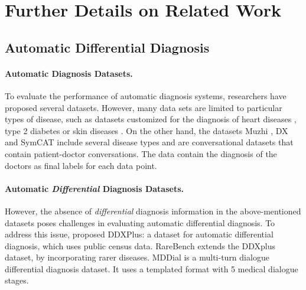 \clearpage
\section{Further Details on Related Work}
\label{app:rel_work}

\subsection{Automatic Differential Diagnosis}

\paragraph{Automatic Diagnosis Datasets.} To evaluate the performance of automatic diagnosis systems, researchers have proposed several datasets. However, many data sets are limited to particular types of disease, such as datasets customized for the diagnosis of heart diseases \cite{ahsan2022machine}, type 2 diabetes \cite{zheng2017machine} or skin diseases \cite{hwang2022differential}. 
 On the other hand, the datasets Muzhi \cite{wei2018task}, DX \cite{xu2019end} and SymCAT \cite{zhong2022hierarchical} include several disease types and are conversational datasets that contain patient-doctor conversations. The data contain the diagnosis of the doctors as final labels for each data point. 

\paragraph{Automatic \emph{Differential} Diagnosis Datasets.}

However, the absence of \textit{differential} diagnosis information in the above-mentioned datasets poses challenges in evaluating automatic differential diagnosis. To address this issue, \citet{fansi2022ddxplus} proposed DDXPlus: a dataset for automatic differential diagnosis, which uses public census data. RareBench \cite{chen2024rarebench} extends the DDXplus dataset, by incorporating rarer diseases. MDDial \cite{macherla2023mddial} is a multi-turn dialogue differential diagnosis dataset. It uses a templated format with 5 medical dialogue stages. 

